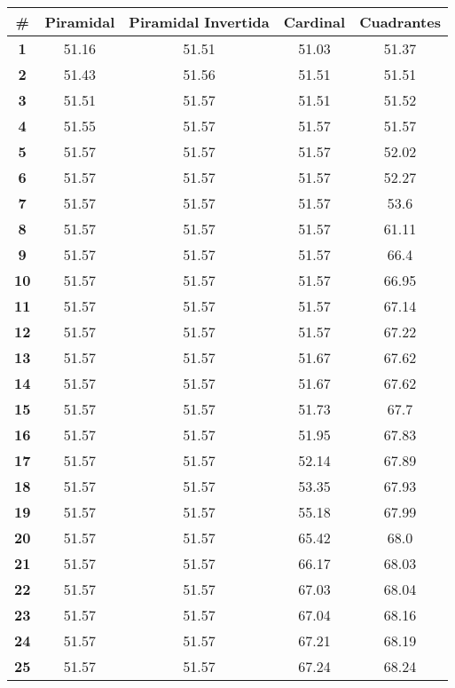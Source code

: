 \begin{longtable}{|c|c|c|c|c|}
    \hline
    \rowcolor[HTML]{ECF4FF} 
    \textbf{\#} & \textbf{Piramidal} & \textbf{Piramidal Invertida} & \textbf{Cardinal} & \textbf{Cuadrantes} \\ \hline
    \endhead
    \textbf{1} & 51.16 & 51.51 & 51.03 & 51.37 \\ \hline 
\textbf{2} & 51.43 & 51.56 & 51.51 & 51.51 \\ \hline 
\textbf{3} & 51.51 & 51.57 & 51.51 & 51.52 \\ \hline 
\textbf{4} & 51.55 & 51.57 & 51.57 & 51.57 \\ \hline 
\textbf{5} & 51.57 & 51.57 & 51.57 & 52.02 \\ \hline 
\textbf{6} & 51.57 & 51.57 & 51.57 & 52.27 \\ \hline 
\textbf{7} & 51.57 & 51.57 & 51.57 & 53.6 \\ \hline 
\textbf{8} & 51.57 & 51.57 & 51.57 & 61.11 \\ \hline 
\textbf{9} & 51.57 & 51.57 & 51.57 & 66.4 \\ \hline 
\textbf{10} & 51.57 & 51.57 & 51.57 & 66.95 \\ \hline 
\textbf{11} & 51.57 & 51.57 & 51.57 & 67.14 \\ \hline 
\textbf{12} & 51.57 & 51.57 & 51.57 & 67.22 \\ \hline 
\textbf{13} & 51.57 & 51.57 & 51.67 & 67.62 \\ \hline 
\textbf{14} & 51.57 & 51.57 & 51.67 & 67.62 \\ \hline 
\textbf{15} & 51.57 & 51.57 & 51.73 & 67.7 \\ \hline 
\textbf{16} & 51.57 & 51.57 & 51.95 & 67.83 \\ \hline 
\textbf{17} & 51.57 & 51.57 & 52.14 & 67.89 \\ \hline 
\textbf{18} & 51.57 & 51.57 & 53.35 & 67.93 \\ \hline 
\textbf{19} & 51.57 & 51.57 & 55.18 & 67.99 \\ \hline 
\textbf{20} & 51.57 & 51.57 & 65.42 & 68.0 \\ \hline 
\textbf{21} & 51.57 & 51.57 & 66.17 & 68.03 \\ \hline 
\textbf{22} & 51.57 & 51.57 & 67.03 & 68.04 \\ \hline 
\textbf{23} & 51.57 & 51.57 & 67.04 & 68.16 \\ \hline 
\textbf{24} & 51.57 & 51.57 & 67.21 & 68.19 \\ \hline 
\textbf{25} & 51.57 & 51.57 & 67.24 & 68.24 \\ \hline 

\end{longtable}
